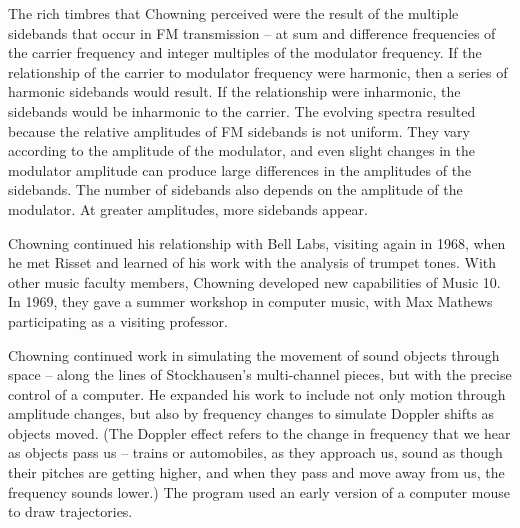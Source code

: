 The rich timbres that Chowning perceived were the result of the multiple sidebands that occur in FM transmission -- at sum and difference frequencies of the carrier frequency and integer multiples of the modulator frequency. If the relationship of the carrier to modulator frequency were harmonic, then a series of harmonic sidebands would result. If the relationship were inharmonic, the sidebands would be inharmonic to the carrier. The evolving spectra resulted because the relative amplitudes of FM sidebands is not uniform. They vary according to the amplitude of the modulator, and even slight changes in the modulator amplitude can produce large differences in the amplitudes of the sidebands. The number of sidebands also depends on the amplitude of the modulator. At greater amplitudes, more sidebands appear.

Chowning continued his relationship with Bell Labs, visiting again in 1968, when he met Risset and learned of his work with the analysis of trumpet tones. With other music faculty members, Chowning developed new capabilities of Music 10. In 1969, they gave a summer workshop in computer music, with Max Mathews participating as a visiting professor.

Chowning continued work in simulating the movement of sound objects through space -- along the lines of Stockhausen's multi-channel pieces, but with the precise control of a computer. He expanded his work to include not only motion through amplitude changes, but also by frequency changes to simulate Doppler shifts as objects moved. (The Doppler effect refers to the change in frequency that we hear as objects pass us -- trains or automobiles, as they approach us, sound as though their pitches are getting higher, and when they pass and move away from us, the frequency sounds lower.) The program used an early version of a computer mouse to draw trajectories.

